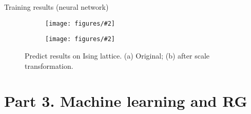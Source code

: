 \documentclass[aspectratio=169]{beamer}
\newcommand\imageinput[2][]{\texttt{[image: figures/\#2]}}
\begin{document}
\begin{frame}{Training results (neural network)}
\begin{figure}
  \centering
  \begin{subfigure}[b]{0.45\textwidth}
    \centering
    \imageinput[width=4.5cm]{ising-learning-net.pdf}
  \end{subfigure}
  \begin{subfigure}[b]{0.45\textwidth}
    \centering
    \imageinput[width=4.5cm]{ising-learning-net-scaled.pdf}
  \end{subfigure}
  \caption{Predict results on Ising lattice. (a) Original; (b) after scale transformation.}
\end{figure}
\end{frame}
\fi

\section{Part 3. Machine learning and RG}
\end{document}
